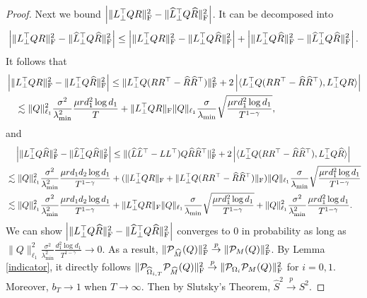 \documentclass[12pt]{article}
\newcommand\fro[1]{\| #1 \|_{\rm{F}}}
\newcommand{\inp}[2]{\langle #1,#2\rangle}
\theoremstyle{plain}
\begin{document}
\begin{proof}
    Next we bound $\left|\fro{L_{\perp}^{\top}Q R}^2 - \fro{\widehat{L}_{\perp}^{\top}Q \widehat{R}}^2\right|$. It can be decomposed into
    \begin{align*}
        \left|\fro{L_{\perp}^{\top}Q R}^2 - \fro{\widehat{L}_{\perp}^{\top}Q \widehat{R}}^2\right|\leq \left|\fro{L_{\perp}^{\top}Q R}^2 - \fro{{L}_{\perp}^{\top}Q \widehat{R}}^2\right| + \left|\fro{L_{\perp}^{\top}Q \widehat{R}}^2 - \fro{\widehat{L}_{\perp}^{\top}Q \widehat{R}}^2\right|.
    \end{align*}
    It follows that
    \begin{align*}
        &\left|\fro{L_{\perp}^{\top}Q R}^2 - \fro{{L}_{\perp}^{\top}Q \widehat{R}}^2\right|\leq \fro{{L}_{\perp}^{\top}Q(RR^{\top}-\widehat{R}\widehat{R}^{\top})}^2 + 2\left|\inp{{L}_{\perp}^{\top}Q(RR^{\top}-\widehat{R}\widehat{R}^{\top})}{L_{\perp}^{\top}Q R}\right| \\
        &\quad \lesssim  \|Q\|_{\ell_1}^2 \frac{\sigma^2}{\lambda_{\min}^2}\frac{\mu rd_1^2\log d_1}{T} + \fro{L_{\perp}^{\top}Q R}\|Q\|_{\ell_1}\frac{\sigma}{\lambda_{\min}}\sqrt{\frac{\mu rd_1^2\log d_1}{T^{1-\gamma}}},
    \end{align*}
    and
    \begin{align*}
        &\quad\left|\fro{L_{\perp}^{\top}Q \widehat{R}}^2 - \fro{\widehat{L}_{\perp}^{\top}Q \widehat{R}}^2\right|\leq \fro{(\widehat{L}\widehat{L}^{\top}-LL^{\top})Q\widehat{R}\widehat{R}^{\top}}^2 + 2\left|\inp{{L}_{\perp}^{\top}Q(RR^{\top}-\widehat{R}\widehat{R}^{\top})}{L_{\perp}^{\top}Q \widehat{R}}\right| \\
        & \lesssim \|Q\|_{\ell_1}^2 \frac{\sigma^2}{\lambda_{\min}^2}\frac{\mu r d_1d_2\log d_1}{T^{1-\gamma}}  + (\fro{L_{\perp}^{\top}Q {R}}+\fro{{L}_{\perp}^{\top}Q(RR^{\top}-\widehat{R}\widehat{R}^{\top})})\|Q\|_{\ell_1} \frac{\sigma}{\lambda_{\min}}\sqrt{\frac{\mu r d_1^2\log d_1}{T^{1-\gamma}}} \\
        & \lesssim \|Q\|_{\ell_1}^2 \frac{\sigma^2}{\lambda_{\min}^2}\frac{\mu r d_1d_2\log d_1}{T^{1-\gamma}} + \fro{L_{\perp}^{\top}Q {R}}\|Q\|_{\ell_1} \frac{\sigma}{\lambda_{\min}}\sqrt{\frac{\mu r d_1^2\log d_1}{T^{1-\gamma}}}  + \|Q\|_{\ell_1}^2 \frac{\sigma^2}{\lambda_{\min}^2}\frac{\mu r d_1^2\log d_1}{T^{1-\gamma}}.
    \end{align*}
    We can show $\left|\fro{L_{\perp}^{\top}Q \widehat{R}}^2 - \fro{\widehat{L}_{\perp}^{\top}Q \widehat{R}}^2\right|$ converges to 0 in probability as long as $\|Q\|_{\ell_1}^2 \frac{\sigma^2}{\lambda_{\min}^2}\frac{d_1^2\log d_1}{T^{1-\gamma}}\rightarrow 0$. 
    As a result, $\fro{\mathcal{P}_{\widehat{M}}(Q)}^2\overset{p}{\rightarrow} \fro{\mathcal{P}_M(Q)}^2$. By Lemma \ref{indicator}, it directly follows $\fro{\mathcal{P}_{\widehat{\Omega}_{i,T}}\mathcal{P}_{\widehat{M}}(Q)}^2\overset{p}{\rightarrow} \fro{\mathcal{P}_{\Omega_i}\mathcal{P}_M(Q)}^2$ for $i=0,1$. Moreover, $b_T\rightarrow 1$ when $T\rightarrow \infty$.
    Then by Slutsky's Theorem, $\widehat{S}^2\overset{p}{\rightarrow} S^2$.
\end{proof}
\end{document}
